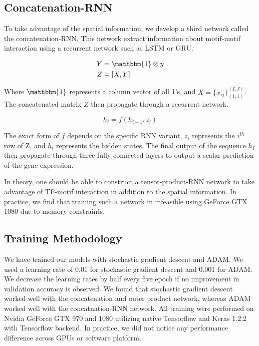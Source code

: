 \documentclass{article}
\begin{document}
\subsection{Concatenation-RNN}

To take advantage of the spatial information, we develop a third network called the concatenation-RNN. This network extract information about motif-motif interaction using a recurrent network such as LSTM or GRU. 

\begin{align}
Y &= \mathbbm{1} \otimes y \\
Z &= [X,Y]
\end{align}

Where $\mathbbm{1}$ represents a column vector of all 1's, and $X = \{ x_{ij} \}_{(1,1)}^{(I,J)}$. The concatenated matrix $Z$ then propagate through a recurrent network. 

\begin{equation}
h_i = f(h_{i-1},z_i)
\end{equation}

The exact form of $f$ depends on the specific RNN variant, $z_i$ represents the $i^{th}$ row of Z, and $h_i$ represents the hidden states. The final output of the sequence $h_I$ then propagate through three fully connected layers to output a scalar prediction of the gene expression. 

In theory, one should be able to construct a tensor-product-RNN network to take advantage of TF-motif interaction in addition to the spatial information. In practice, we find that training such a network in infeasible using GeForce GTX 1080 due to memory constraints.  

\subsection{Training Methodology}

We have trained our models with stochastic gradient descent and ADAM. We used a learning rate of 0.01 for stochastic gradient descent and 0.001 for ADAM. We decrease the learning rates by half every five epoch if no improvement in validation accuracy is observed. We found that stochastic gradient descent worked well with the concatenation and outer product network, whereas ADAM worked well with the concatnation-RNN network. All training were performed on Nvidia GeForce GTX 970 and 1080 utilizing native Tensorflow and Keras 1.2.2 with Tensorflow backend. In practice, we did not notice any performance difference across GPUs or software platform. 
\end{document}
